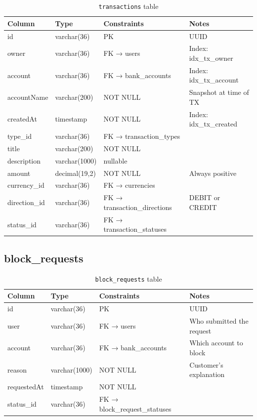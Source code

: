 \documentclass[12pt,a4paper]{report}
\begin{document}
\begin{table}[H]
  \centering
  \caption{\texttt{transactions} table}
  \begin{tabular}{llll}
    \toprule
    \textbf{Column} & \textbf{Type} & \textbf{Constraints} & \textbf{Notes} \\
    \midrule
    id           & varchar(36)   & PK              & UUID \\
    owner        & varchar(36)   & FK → users      & Index: idx\_tx\_owner \\
    account      & varchar(36)   & FK → bank\_accounts & Index: idx\_tx\_account \\
    accountName  & varchar(200)  & NOT NULL        & Snapshot at time of TX \\
    createdAt    & timestamp     & NOT NULL        & Index: idx\_tx\_created \\
    type\_id     & varchar(36)   & FK → transaction\_types & \\
    title        & varchar(200)  & NOT NULL        & \\
    description  & varchar(1000) & nullable        & \\
    amount       & decimal(19,2) & NOT NULL        & Always positive \\
    currency\_id & varchar(36)   & FK → currencies & \\
    direction\_id& varchar(36)   & FK → transaction\_directions & DEBIT or CREDIT \\
    status\_id   & varchar(36)   & FK → transaction\_statuses & \\
    \bottomrule
  \end{tabular}
\end{table}

\subsection{block\_requests}

\begin{table}[H]
  \centering
  \caption{\texttt{block\_requests} table}
  \begin{tabular}{llll}
    \toprule
    \textbf{Column} & \textbf{Type} & \textbf{Constraints} & \textbf{Notes} \\
    \midrule
    id           & varchar(36)   & PK              & UUID \\
    user         & varchar(36)   & FK → users      & Who submitted the request \\
    account      & varchar(36)   & FK → bank\_accounts & Which account to block \\
    reason       & varchar(1000) & NOT NULL        & Customer's explanation \\
    requestedAt  & timestamp     & NOT NULL        & \\
    status\_id   & varchar(36)   & FK → block\_request\_statuses & \\
    \bottomrule
  \end{tabular}
\end{table}
\end{document}
